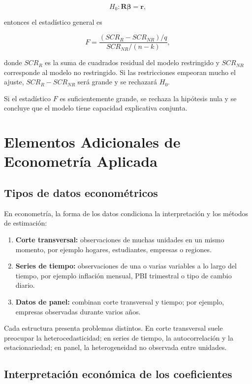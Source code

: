 \documentclass[11pt,a4paper]{article}
\begin{document}
\[
H_0:\mathbf{R}\boldsymbol{\beta}=\mathbf{r},
\]

entonces el estadístico general es

\[
F=\frac{(SCR_R-SCR_{NR})/q}{SCR_{NR}/(n-k)},
\]

donde \(SCR_R\) es la suma de cuadrados residual del modelo restringido y \(SCR_{NR}\) corresponde al modelo no restringido. Si las restricciones empeoran mucho el ajuste, \(SCR_R-SCR_{NR}\) será grande y se rechazará \(H_0\).

Si el estadístico \(F\) es suficientemente grande, se rechaza la hipótesis nula y se concluye que el modelo tiene capacidad explicativa conjunta.

\section{Elementos Adicionales de Econometría Aplicada}

\subsection{Tipos de datos econométricos}

En econometría, la forma de los datos condiciona la interpretación y los métodos de estimación:

\begin{enumerate}[noitemsep]
    \item \textbf{Corte transversal:} observaciones de muchas unidades en un mismo momento, por ejemplo hogares, estudiantes, empresas o regiones.
    \item \textbf{Series de tiempo:} observaciones de una o varias variables a lo largo del tiempo, por ejemplo inflación mensual, PBI trimestral o tipo de cambio diario.
    \item \textbf{Datos de panel:} combinan corte transversal y tiempo; por ejemplo, empresas observadas durante varios años.
\end{enumerate}

Cada estructura presenta problemas distintos. En corte transversal suele preocupar la heterocedasticidad; en series de tiempo, la autocorrelación y la estacionariedad; en panel, la heterogeneidad no observada entre unidades.

\subsection{Interpretación económica de los coeficientes}
\end{document}
